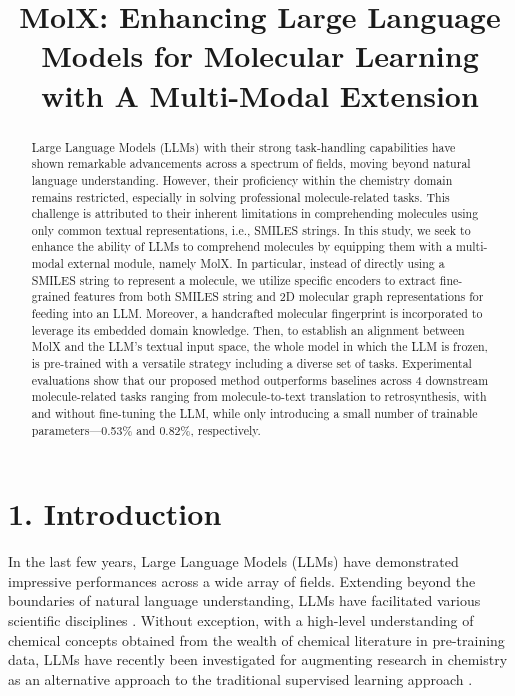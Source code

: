 \title{MolX: Enhancing Large Language Models for Molecular Learning\\with A Multi-Modal Extension}



\maketitle

\begin{abstract}
Large Language Models (LLMs) with their strong task-handling capabilities have shown remarkable advancements across a spectrum of fields, moving beyond natural language understanding. However, their proficiency within the chemistry domain remains restricted, especially in solving professional molecule-related tasks. This challenge is attributed to their inherent limitations in comprehending molecules using only common textual representations, i.e., SMILES strings. In this study, we seek to enhance the ability of LLMs to comprehend molecules by equipping them with a multi-modal external module, namely MolX. In particular, instead of directly using a SMILES string to represent a molecule, we utilize specific encoders to extract fine-grained features from both SMILES string and 2D molecular graph representations for feeding into an LLM. Moreover, a handcrafted molecular fingerprint is incorporated to leverage its embedded domain knowledge. Then, to establish an alignment between MolX and the LLM’s textual input space, the whole model in which the LLM is frozen, is pre-trained with a versatile strategy including a diverse set of tasks. Experimental evaluations show that our proposed method outperforms baselines across 4 downstream molecule-related tasks ranging from molecule-to-text translation to retrosynthesis, with and without fine-tuning the LLM, while only introducing a small number of trainable parameters—0.53\% and 0.82\%, respectively. 
\end{abstract}

\section{1. Introduction}
In the last few years, Large Language Models (LLMs) have demonstrated impressive performances across a wide array of fields. Extending beyond the boundaries of natural language understanding, LLMs have facilitated various scientific disciplines \cite{taylor2022galactica, telenti2024large}. Without exception, with a high-level understanding of chemical concepts obtained from the wealth of chemical literature in pre-training data, LLMs have recently been investigated for augmenting research in chemistry as an alternative approach to the traditional supervised learning approach \cite{castro2023large, achiam2023gpt}. 

